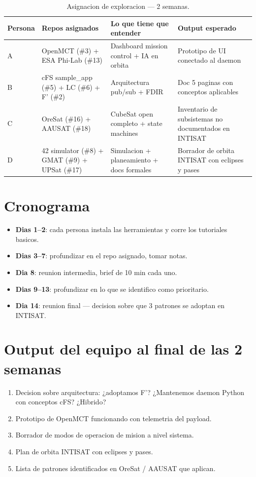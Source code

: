 \documentclass[11pt,a4paper,oneside]{report}
\begin{document}
\begin{table}[h!]
\centering
\caption{Asignacion de exploracion --- 2 semanas.}
\renewcommand{\arraystretch}{1.4}
\begin{tabular}{p{1cm}p{4.5cm}p{4.5cm}p{4cm}}
\toprule
\textbf{Persona} & \textbf{Repos asignados} & \textbf{Lo que tiene que entender} & \textbf{Output esperado} \\
\midrule
A & OpenMCT (\#3) + ESA Phi-Lab (\#13) & Dashboard mission control + IA en orbita & Prototipo de UI conectado al daemon \\
B & cFS sample\_app (\#5) + LC (\#6) + F' (\#2) & Arquitectura pub/sub + FDIR & Doc 5 paginas con conceptos aplicables \\
C & OreSat (\#16) + AAUSAT (\#18) & CubeSat open completo + state machines & Inventario de subsistemas no documentados en INTISAT \\
D & 42 simulator (\#8) + GMAT (\#9) + UPSat (\#17) & Simulacion + planeamiento + docs formales & Borrador de orbita INTISAT con eclipses y pases \\
\bottomrule
\end{tabular}
\end{table}

\section{Cronograma}

\begin{itemize}[leftmargin=2em]
  \item \textbf{Dias 1--2}: cada persona instala las herramientas y corre los
        tutoriales basicos.
  \item \textbf{Dias 3--7}: profundizar en el repo asignado, tomar notas.
  \item \textbf{Dia 8}: reunion intermedia, brief de 10 min cada uno.
  \item \textbf{Dias 9--13}: profundizar en lo que se identifico como
        prioritario.
  \item \textbf{Dia 14}: reunion final --- decision sobre que 3 patrones se
        adoptan en INTISAT.
\end{itemize}

\section{Output del equipo al final de las 2 semanas}

\begin{enumerate}[leftmargin=2em]
  \item Decision sobre arquitectura: ¿adoptamos F'? ¿Mantenemos daemon
        Python con conceptos cFS? ¿Hibrido?
  \item Prototipo de OpenMCT funcionando con telemetria del payload.
  \item Borrador de modos de operacion de mision a nivel sistema.
  \item Plan de orbita INTISAT con eclipses y pases.
  \item Lista de patrones identificados en OreSat / AAUSAT que aplican.
\end{enumerate}
\end{document}
